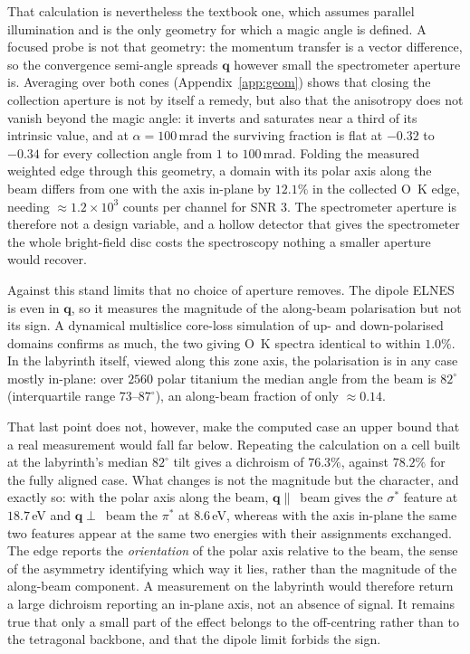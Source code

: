 \documentclass[aps,prb,twocolumn,superscriptaddress,floatfix,nofootinbib]{revtex4-2}
\begin{document}
That calculation is nevertheless the textbook one, which assumes parallel illumination and is
the only geometry for which a magic angle is defined. A focused probe is not that geometry: the
momentum transfer is a vector difference, so the convergence semi-angle spreads $\mathbf{q}$
however small the spectrometer aperture is. Averaging over both cones
(Appendix~\ref{app:geom}) shows that closing the collection aperture is not by itself a remedy,
but also that the anisotropy does not vanish beyond the magic angle: it inverts and saturates
near a third of its intrinsic value, and at $\alpha=100$\,mrad the surviving fraction is flat at
$-0.32$ to $-0.34$ for every collection angle from $1$ to $100$\,mrad. Folding the measured
weighted edge through this geometry, a domain with its polar axis along the beam differs from one
with the axis in-plane by $12.1\%$ in the collected O~K edge, needing
$\approx1.2\times10^{3}$ counts per channel for SNR $3$. The spectrometer aperture is therefore
not a design variable, and a hollow detector that gives the spectrometer the whole bright-field
disc costs the spectroscopy nothing a smaller aperture would recover.

Against this stand limits that no choice of aperture removes. The dipole ELNES is even in
$\mathbf{q}$, so it measures the magnitude of the along-beam polarisation but not its sign. A
dynamical multislice core-loss simulation of up- and down-polarised domains confirms as much,
the two giving O~K spectra identical to within $1.0\%$. In the labyrinth itself, viewed along
this zone axis, the polarisation is in any case mostly in-plane: over $2560$ polar titanium the
median angle from the beam is $82^\circ$
(interquartile range $73$--$87^\circ$), an along-beam fraction of only $\approx0.14$.

That last point does not, however, make the computed case an upper bound that a real measurement
would fall far below. Repeating the calculation on a cell built at the labyrinth's median
$82^\circ$ tilt gives a dichroism of $76.3\%$, against $78.2\%$ for the fully aligned case. What
changes is not the magnitude but the character, and exactly so: with the polar axis along the
beam, $\mathbf{q}\parallel$~beam gives the $\sigma^*$ feature at $18.7$\,eV and
$\mathbf{q}\perp$~beam the $\pi^*$ at $8.6$\,eV, whereas with the axis in-plane the same two
features appear at the same two energies with their assignments exchanged. The edge reports the
\emph{orientation} of the polar axis relative to the beam, the sense of the asymmetry
identifying which way it lies, rather than the magnitude of the along-beam component. A
measurement on the labyrinth would therefore return a large dichroism reporting an in-plane axis,
not an absence of signal. It remains true that only a small part of the effect belongs to the
off-centring rather than to the tetragonal backbone, and that the dipole limit forbids the sign.
\end{document}
